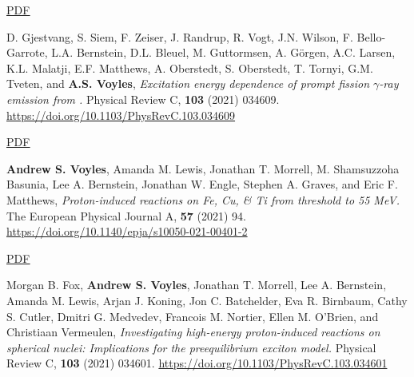 \begin{bibsection}
\ifshort \vspace{0.1cm} \href{https://avoyles.github.io/papers/Friedrich2021_MMC.pdf}{\underline{PDF}} \else  \fi 

\item D. Gjestvang, S. Siem, F. Zeiser, J. Randrup, R. Vogt, J.N. Wilson, F. Bello-Garrote, L.A. Bernstein, D.L. Bleuel, M. Guttormsen, A. Görgen, A.C. Larsen, K.L. Malatji, E.F. Matthews, A. Oberstedt, S. Oberstedt, T. Tornyi, G.M. Tveten, and \textbf{A.S. Voyles}, \emph{Excitation energy dependence of prompt fission $\gamma$-ray emission from  .} Physical Review C, \textbf{103} (2021) 034609. \\\url{https://doi.org/10.1103/PhysRevC.103.034609} 

\ifshort \vspace{0.1cm} \href{https://avoyles.github.io/papers/Gjestvang2021_241Pu.pdf}{\underline{PDF}} \else  \fi 


\item \textbf{Andrew S. Voyles}, Amanda M. Lewis, Jonathan T. Morrell, M. Shamsuzzoha Basunia, Lee A. Bernstein, Jonathan W. Engle, Stephen A. Graves, and Eric F. Matthews, \emph{Proton-induced reactions on Fe, Cu, \& Ti from threshold to 55 MeV.} The European Physical Journal A, \textbf{57} (2021) 94. \\\url{https://doi.org/10.1140/epja/s10050-021-00401-2} 

\ifshort \vspace{0.1cm} \href{https://avoyles.github.io/papers/Voyles2021_Fe_px.pdf}{\underline{PDF}} \else  \fi 


\item Morgan B. Fox, \textbf{Andrew S. Voyles}, Jonathan T. Morrell, Lee A. Bernstein, Amanda M. Lewis, Arjan J. Koning, Jon C. Batchelder, Eva R. Birnbaum, Cathy S. Cutler, Dmitri G. Medvedev, Francois M. Nortier, Ellen M. O’Brien, and Christiaan Vermeulen, \emph{Investigating high-energy proton-induced reactions on spherical nuclei: Implications for the preequilibrium exciton model.} Physical Review C, \textbf{103} (2021) 034601. \url{https://doi.org/10.1103/PhysRevC.103.034601} 


\end{bibsection}
